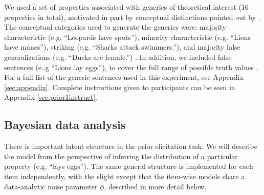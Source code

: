 \documentclass[10pt,letterpaper]{article}
\begin{document}
We used a set of properties associated with generics of theoretical interest (16 properties in total), motivated in part by conceptual distinctions pointed out by . 
The conceptual categories used to generate the generics were: majority characteristic (e.g. ``Leopards have spots''), minority characteristic (e.g. ``Lions have manes''), striking (e.g. ``Sharks attack swimmers.''), and majority false generalizations (e.g. ``Ducks are female.'') \cite{Prasada2013}. In addition, we included false sentences (e..g ``Lions lay eggs''), to cover the full range of possible truth values .
For a full list of the generic sentences used in this experiment, see Appendix \ref{sec:appendix}.
Complete instructions given to participants can be seen in Appendix \ref{sec:prior1instruct}.



\subsection{Bayesian data analysis}
\label{sec:bda1}

There is important latent structure in the prior elicitation task. We will describe the model from the perspective of inferring the distribution of a particular property (e.g. ``lays eggs''). 
The same general structure is implemented for each item independently, with the slight except that the item-wise models share a data-analytic noise parameter $\phi$, described in more detail below. 
\end{document}
